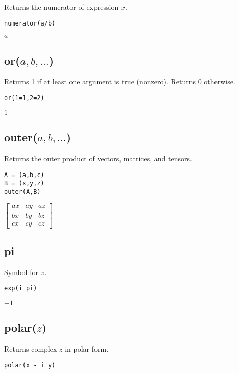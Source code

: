 \documentclass[12pt]{article}
\begin{document}
Returns the numerator of expression $x$.

{\color{blue}
\begin{verbatim}
numerator(a/b)
\end{verbatim}
}

\noindent
$a$

\subsection*{or($a,b,\ldots$)}

Returns 1 if at least one argument is true (nonzero).
Returns 0 otherwise.

{\color{blue}
\begin{verbatim}
or(1=1,2=2)
\end{verbatim}
}

\noindent
$1$

\subsection*{outer($a,b,\ldots$)}

Returns the outer product of vectors, matrices, and tensors.

{\color{blue}
\begin{verbatim}
A = (a,b,c)
B = (x,y,z)
outer(A,B)
\end{verbatim}
}

\noindent
$\displaystyle
\begin{bmatrix}
a x & a y & a z
\\[1ex]
b x & b y & b z
\\[1ex]
c x & c y & c z
\end{bmatrix}
$

\subsection*{pi}

Symbol for $\pi$.

{\color{blue}
\begin{verbatim}
exp(i pi)
\end{verbatim}
}

\noindent
$-1$

\subsection*{polar($z$)}

Returns complex $z$ in polar form.

{\color{blue}
\begin{verbatim}
polar(x - i y)
\end{verbatim}
}
\end{document}
